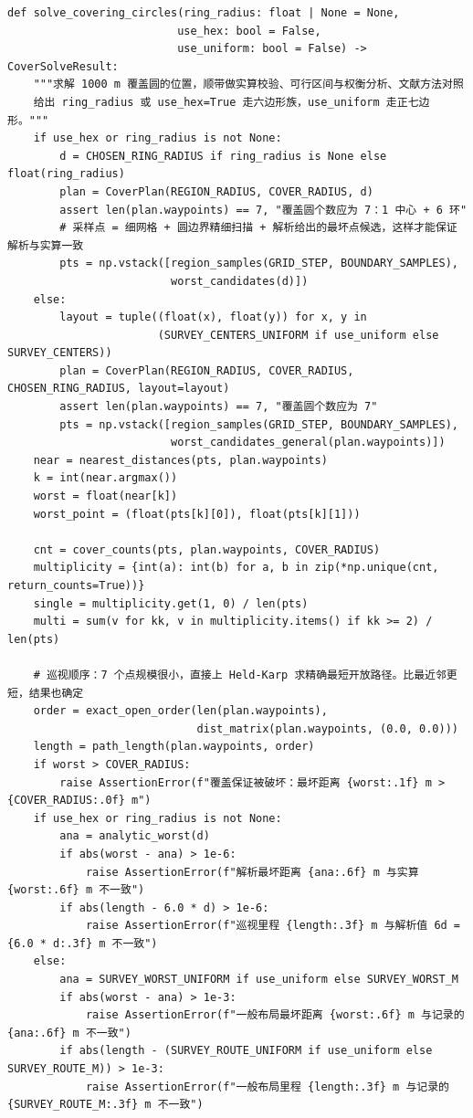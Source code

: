 \documentclass[UTF8, zihao=5,AutoFakeBold=2]{ctexart}
\begin{document}
\begin{lstlisting}
def solve_covering_circles(ring_radius: float | None = None,
                          use_hex: bool = False,
                          use_uniform: bool = False) -> CoverSolveResult:
    """求解 1000 m 覆盖圆的位置，顺带做实算校验、可行区间与权衡分析、文献方法对照
    给出 ring_radius 或 use_hex=True 走六边形族，use_uniform 走正七边形。"""
    if use_hex or ring_radius is not None:
        d = CHOSEN_RING_RADIUS if ring_radius is None else float(ring_radius)
        plan = CoverPlan(REGION_RADIUS, COVER_RADIUS, d)
        assert len(plan.waypoints) == 7, "覆盖圆个数应为 7：1 中心 + 6 环"
        # 采样点 = 细网格 + 圆边界精细扫描 + 解析给出的最坏点候选，这样才能保证解析与实算一致
        pts = np.vstack([region_samples(GRID_STEP, BOUNDARY_SAMPLES),
                         worst_candidates(d)])
    else:
        layout = tuple((float(x), float(y)) for x, y in
                       (SURVEY_CENTERS_UNIFORM if use_uniform else SURVEY_CENTERS))
        plan = CoverPlan(REGION_RADIUS, COVER_RADIUS, CHOSEN_RING_RADIUS, layout=layout)
        assert len(plan.waypoints) == 7, "覆盖圆个数应为 7"
        pts = np.vstack([region_samples(GRID_STEP, BOUNDARY_SAMPLES),
                         worst_candidates_general(plan.waypoints)])
    near = nearest_distances(pts, plan.waypoints)
    k = int(near.argmax())
    worst = float(near[k])
    worst_point = (float(pts[k][0]), float(pts[k][1]))

    cnt = cover_counts(pts, plan.waypoints, COVER_RADIUS)
    multiplicity = {int(a): int(b) for a, b in zip(*np.unique(cnt, return_counts=True))}
    single = multiplicity.get(1, 0) / len(pts)
    multi = sum(v for kk, v in multiplicity.items() if kk >= 2) / len(pts)

    # 巡视顺序：7 个点规模很小，直接上 Held-Karp 求精确最短开放路径。比最近邻更短，结果也确定
    order = exact_open_order(len(plan.waypoints),
                             dist_matrix(plan.waypoints, (0.0, 0.0)))
    length = path_length(plan.waypoints, order)
    if worst > COVER_RADIUS:
        raise AssertionError(f"覆盖保证被破坏：最坏距离 {worst:.1f} m > {COVER_RADIUS:.0f} m")
    if use_hex or ring_radius is not None:
        ana = analytic_worst(d)
        if abs(worst - ana) > 1e-6:
            raise AssertionError(f"解析最坏距离 {ana:.6f} m 与实算 {worst:.6f} m 不一致")
        if abs(length - 6.0 * d) > 1e-6:
            raise AssertionError(f"巡视里程 {length:.3f} m 与解析值 6d = {6.0 * d:.3f} m 不一致")
    else:
        ana = SURVEY_WORST_UNIFORM if use_uniform else SURVEY_WORST_M
        if abs(worst - ana) > 1e-3:
            raise AssertionError(f"一般布局最坏距离 {worst:.6f} m 与记录的 {ana:.6f} m 不一致")
        if abs(length - (SURVEY_ROUTE_UNIFORM if use_uniform else SURVEY_ROUTE_M)) > 1e-3:
            raise AssertionError(f"一般布局里程 {length:.3f} m 与记录的 {SURVEY_ROUTE_M:.3f} m 不一致")


\end{lstlisting}
\end{document}
